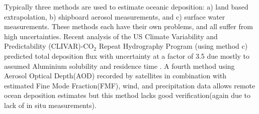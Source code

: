 Typically three methods are used to estimate oceanic deposition: a) land based extrapolation, b) shipboard aerosol measurements, and c) surface water measurements. 
These methods each have their own problems, and all suffer from high uncertainties. 
Recent analysis of the US Climate Variability and Predictability (CLIVAR)-CO$_2$ Repeat Hydrography Program (using method c) predicted total deposition flux with uncertainty at a factor of 3.5 due mostly to assumed Aluminium solubility and residence time \cite{Grand_2015}.
A fourth method using Aerosol Optical Depth(AOD) recorded by satellites in combination with estimated Fine Mode Fraction(FMF), wind, and precipitation data allows remote ocean deposition estimates but this method lacks good verification(again due to lack of in situ measurements). 


  
  
  
  
  
  
  
  